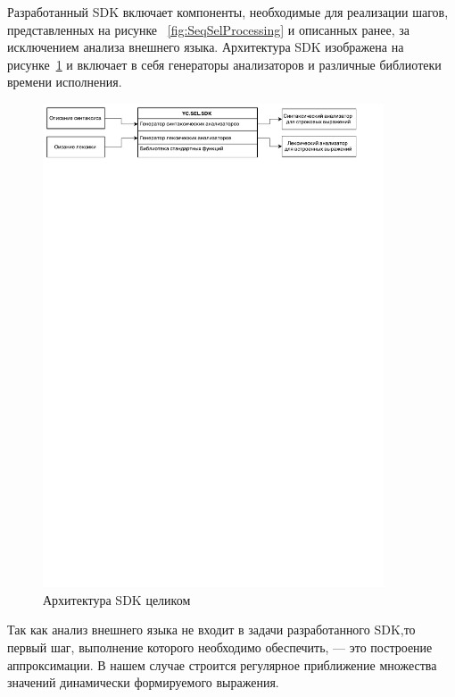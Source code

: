 Разработанный SDK включает компоненты, необходимые для реализации шагов, представленных на рисунке ~\ref{fig:SeqSelProcessing} и описанных ранее, за исключением анализа внешнего языка. Архитектура SDK изображена на рисунке~\ref{fig:SDKHLArch} и включает в себя генераторы анализаторов и различные библиотеки времени исполнения.

\begin{figure}[h!]
\begin{center}
\includegraphics[width=0.9\textwidth]{pics/HighLevelArch}
\caption{Архитектура SDK целиком}
\label{fig:SDKHLArch} 
\end{center}
\end{figure}

Так как анализ внешнего языка не входит в задачи разработанного SDK,то первый шаг, выполнение которого необходимо обеспечить, --- это построение аппроксимации. В нашем случае строится регулярное приближение множества значений динамически формируемого выражения.

